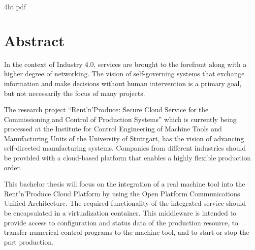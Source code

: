 \documentclass[
a4paper,
twoside,
headsepline,
cleardoublepage=empty,
parskip=half,
draft=false
]{scrbook}
\begin{document}
	\iftex4ht
	\Configure{$}{\PicMath}{\EndPicMath}{}
	{pdf}
	{%
	}
	\fi

	


	
	\Titelblatt

	\pagestyle{preamble}
	\renewcommand*{\chapterpagestyle}{preamble}

	\section*{Abstract}

		In the context of Industry 4.0, services are brought to the forefront along with a higher degree of networking.
		The vision of self-governing systems that exchange information and make decisions without human intervention is a primary goal, but not necessarily the focus of many projects.

		The research project ``Rent'n'Produce: Secure Cloud Service for the Commissioning and Control of Production Systems'' which is currently being processed at the Institute for Control Engineering of Machine Tools and Manufacturing Units of the University of Stuttgart, has the vision of advancing self-directed manufacturing systems.
		Companies from different industries should be provided with a cloud-based platform that enables a highly flexible production order.

		This bachelor thesis will focus on the integration of a real machine tool into the Rent'n'Produce Cloud Platform by using the Open Platform Communications Unified Architecture.
		The required functionality of the integrated service should be encapsulated in a virtualization container.
		This middleware is intended to provide access to configuration and status data of the production resource, to transfer numerical control programs to the machine tool, and to start or stop the part production.
\end{document}
